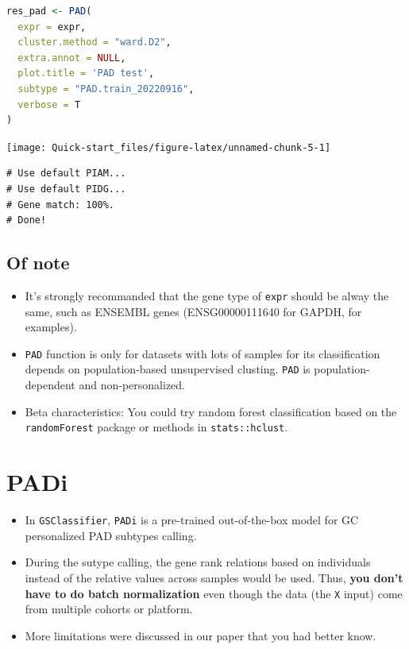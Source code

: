 \documentclass[
  12pt,
]{book}
\newcommand{\passthrough}[1]{#1}
\begin{document}
\begin{lstlisting}[language=R]
res_pad <- PAD(
  expr = expr,
  cluster.method = "ward.D2",
  extra.annot = NULL,
  plot.title = 'PAD test',
  subtype = "PAD.train_20220916",
  verbose = T
)
\end{lstlisting}

\begin{center}\texttt{[image: Quick-start\_files/figure-latex/unnamed-chunk-5-1]} \end{center}

\begin{lstlisting}
# Use default PIAM... 
# Use default PIDG... 
# Gene match: 100%. 
# Done!
\end{lstlisting}

\hypertarget{of-note}{%
\subsection{Of note}\label{of-note}}

\begin{itemize}
\item
  It's strongly recommanded that the gene type of \passthrough{\lstinline!expr!} should be alway the same, such as ENSEMBL genes (ENSG00000111640 for GAPDH, for examples).
\item
  \passthrough{\lstinline!PAD!} function is only for datasets with lots of samples for its classification depends on population-based unsupervised clusting. \passthrough{\lstinline!PAD!} is population-dependent and non-personalized.
\item
  Beta characteristics: You could try random forest classification based on the \passthrough{\lstinline!randomForest!} package or methods in \passthrough{\lstinline!stats::hclust!}.
\end{itemize}

\hypertarget{padi}{%
\section{PADi}\label{padi}}

\begin{itemize}
\item
  In \passthrough{\lstinline!GSClassifier!}, \passthrough{\lstinline!PADi!} is a pre-trained out-of-the-box model for GC personalized PAD subtypes calling.
\item
  During the sutype calling, the gene rank relations based on individuals instead of the relative values across samples would be used. Thus, \textbf{you don't have to do batch normalization} even though the data (the \passthrough{\lstinline!X!} input) come from multiple cohorts or platform.
\item
  More limitations were discussed in our paper that you had better know.
\end{itemize}
\end{document}
